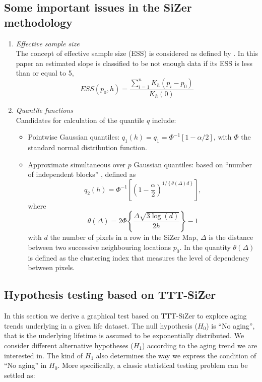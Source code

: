 \documentclass[preprint,12pt]{elsarticle}
\begin{document}
\subsection{Some important issues in the SiZer methodology}
\begin{enumerate}
\item {\it Effective sample size} \\
\noindent The  concept of effective sample size (ESS) is considered as defined by \cite{CM99}. In this paper an estimated slope is classified to be not enough data if its ESS is less than or equal to 5, 
$$
ESS(p_0,h) = \frac{\sum_{i=1}^n K_h(p_i-p_0)}{K_h(0)}
$$
\item {\it Quantile functions} \\
\noindent Candidates for calculation of the quantile $q$ include:
\begin{itemize}
	\item Pointwise Gaussian quantiles: $q_1(h) = q_1 = \Phi^{-1}[1-\alpha/2]$, with $\Phi$ the standard normal distribution function. 
	\item Approximate simultaneous over $p$ Gaussian quantiles: based on ``number of independent blocks'' \cite{HM2006}, defined as
	$$
	q_2(h) = \Phi^{-1} \left[\left(1- \frac{\alpha}{2}\right)^{1/\left\{\theta(\Delta)d\right\}}\right],
	$$
	where
	$$
	\theta(\Delta) =2 \Phi \left\{ \frac{\Delta \sqrt{3 \log(d)}}{2h}\right\}-1
	$$
	with $d$ the number of pixels in a row in the SiZer Map, $\Delta$ is the distance between two successive neighbouring locations $p_0$. In \cite{HM2006} the quantity $\theta(\Delta)$ is defined as the clustering index that measures the level of dependency between pixels. 
\end{itemize}
\end{enumerate}

\subsection{Hypothesis testing based on TTT-SiZer}

In this section we derive a graphical test based on TTT-SiZer  to explore aging  trends underlying in a given life dataset. The null hypothesis ($H_0$) is ``No aging'', that is the underlying lifetime is assumed to be exponentially distributed. We consider different alternative hypotheses ($H_1$)  according to the aging trend we are interested in. The kind of $H_1$ also determines the way we express the condition of ``No aging'' in $H_0$. More specifically, a classic statistical testing problem can be settled  as:
\end{document}

